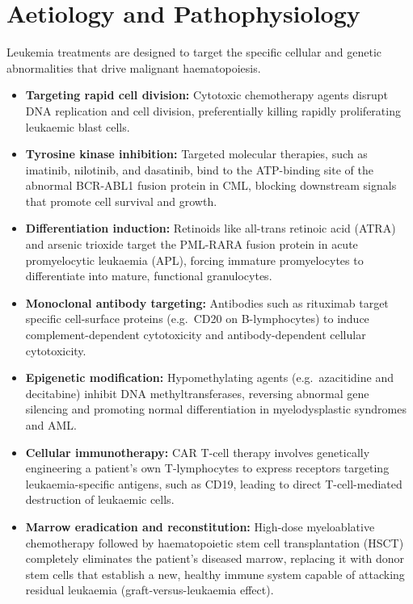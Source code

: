 \section*{Aetiology and Pathophysiology}
Leukemia treatments are designed to target the specific cellular and genetic abnormalities that drive malignant haematopoiesis.
\begin{itemize}
    \item \textbf{Targeting rapid cell division:} Cytotoxic chemotherapy agents disrupt DNA replication and cell division, preferentially killing rapidly proliferating leukaemic blast cells.
    \item \textbf{Tyrosine kinase inhibition:} Targeted molecular therapies, such as imatinib, nilotinib, and dasatinib, bind to the ATP-binding site of the abnormal BCR-ABL1 fusion protein in CML, blocking downstream signals that promote cell survival and growth.
    \item \textbf{Differentiation induction:} Retinoids like all-trans retinoic acid (ATRA) and arsenic trioxide target the PML-RARA fusion protein in acute promyelocytic leukaemia (APL), forcing immature promyelocytes to differentiate into mature, functional granulocytes.
    \item \textbf{Monoclonal antibody targeting:} Antibodies such as rituximab target specific cell-surface proteins (e.g.\ CD20 on B-lymphocytes) to induce complement-dependent cytotoxicity and antibody-dependent cellular cytotoxicity.
    \item \textbf{Epigenetic modification:} Hypomethylating agents (e.g.\ azacitidine and decitabine) inhibit DNA methyltransferases, reversing abnormal gene silencing and promoting normal differentiation in myelodysplastic syndromes and AML.
    \item \textbf{Cellular immunotherapy:} CAR T-cell therapy involves genetically engineering a patient's own T-lymphocytes to express receptors targeting leukaemia-specific antigens, such as CD19, leading to direct T-cell-mediated destruction of leukaemic cells.
    \item \textbf{Marrow eradication and reconstitution:} High-dose myeloablative chemotherapy followed by haematopoietic stem cell transplantation (HSCT) completely eliminates the patient's diseased marrow, replacing it with donor stem cells that establish a new, healthy immune system capable of attacking residual leukaemia (graft-versus-leukaemia effect).
\end{itemize}

